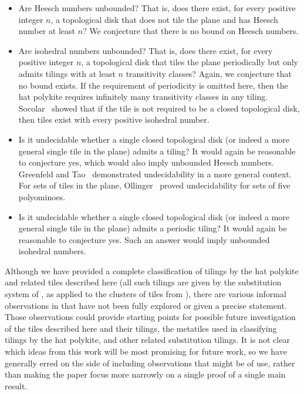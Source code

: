 \begin{itemize}
  \item Are Heesch numbers unbounded?  That is, does there exist, for
  	every positive integer $n$, a topological disk that does not tile the 
	plane and has Heesch number at least $n$?  We conjecture that there is
	no bound on Heesch numbers.

  \item Are isohedral numbers unbounded?  That is, does there exist, for
  	every positive integer $n$, a topological disk that tiles the plane 
	periodically
	but only admits tilings with at least $n$ transitivity classes?  Again,
	we conjecture that no bound exists.  If the requirement of periodicity
	is omitted here, then the hat polykite requires infinitely many 
	transitivity classes in any tiling. 
	Socolar~\cite{Socolar} showed that if the tile is not required to be
    a closed topological disk, then tiles exist with every positive
	isohedral number.

  \item Is it undecidable whether a single closed topological disk (or
    indeed a more general single tile in the plane) admits a tiling?
    It would again be reasonable to conjecture yes, which would also
    imply unbounded Heesch numbers.  Greenfeld and
    Tao~\cite{GT1} demonstrated undecidability in a more general
    context.  For sets of tiles in the plane, Ollinger~\cite{Ollinger}
    proved  undecidability for sets of five polyominoes.

  \item Is it undecidable whether a single closed topological disk (or
    indeed a more general single tile in the plane) admits a periodic
    tiling?  It would again be reasonable to conjecture yes.  Such
    an answer would imply unbounded isohedral numbers.
\end{itemize}

Although we have provided a complete classification of tilings by the
hat polykite and related tiles described here (all such tilings are
given by the substitution system of , as applied to
the clusters of tiles from ), there are various
informal observations in  that have not been
fully explored or given a precise statement.  Those observations could
provide starting points for possible future investigation of the tiles
described here and their tilings, the metatiles used in classifying
tilings by the hat polykite, and other related substitution tilings.
It is not clear which ideas from this work will be most promising for
future work, so we have generally erred on the side of including 
observations that might be of use, rather than making the paper focus
more narrowly on a single proof of a single main result.

